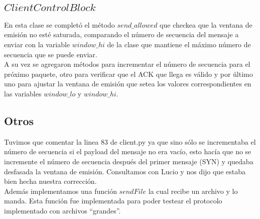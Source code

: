 \subsection{$ClientControlBlock$}

\indent En esta clase se completó el método $send\_allowed$ que checkea que la ventana de emisión no esté saturada, comparando el número de secuencia del mensaje a enviar con la variable $window\_hi$ de la clase que mantiene el máximo número de secuencia que se puede enviar.\\
\indent A su vez se agregaron métodos para incrementar el número de secuencia para el próximo paquete, otro para verificar que el ACK que llega es válido y por último uno para ajustar la ventana de emisión que setea los valores correspondientes en las variables $window\_lo$ y $window\_hi$.\\

\subsection{Otros}
\indent Tuvimos que comentar la linea 83 de client.py ya que sino sólo se incrementaba el número de secuencia si el payload del mensaje no era vacío, esto hacía que no se incremente el número de secuencia después del primer mensaje (SYN) y quedaba desfasada la ventana de emisión. Consultamos con Lucio y nos dijo que estaba bien hecha nuestra corrección. \\
Además implementamos una función $sendFile$ la cual recibe un archivo y lo manda. Esta función fue implementada para poder testear el protocolo implementado con archivos ``grandes''.


